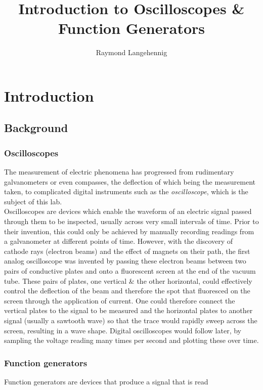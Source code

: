 \documentclass{article}
\title{Introduction to Oscilloscopes \& Function Generators}
\author{Raymond Langehennig}
\begin{document}
\maketitle

\section{Introduction}
    \subsection{Background}
        \subsubsection{Oscilloscopes}
            The measurement of electric phenomena has progressed from rudimentary galvanometers or even compasses, the deflection of which being the measurement taken, to complicated digital instruments such as the \emph{oscilloscope}, which is the subject of this lab.\\
            Oscilloscopes are devices which enable the waveform of an electric signal passed through them to be inspected, usually across very small intervals of time. Prior to their invention, this could only be achieved by manually recording readings from a galvanometer at different points of time. However, with the discovery of cathode rays (electron beams) and the effect of magnets on their path, the first analog oscilloscope was invented by passing these electron beams between two pairs of conductive plates and onto a fluorescent screen at the end of the vacuum tube. These pairs of plates, one vertical \& the other horizontal, could effectively control the deflection of the beam and therefore the spot that fluoresced on the screen through the application of current. One could therefore connect the vertical plates to the signal to be measured and the horizontal plates to another signal (usually a sawtooth wave) so that the trace would rapidly sweep across the screen, resulting in a wave shape. Digital oscilloscopes would follow later, by sampling the voltage reading many times per second and plotting these over time.
        
        \subsubsection{Function generators}
            Function generators are devices that produce a signal that is read 
\end{document}

